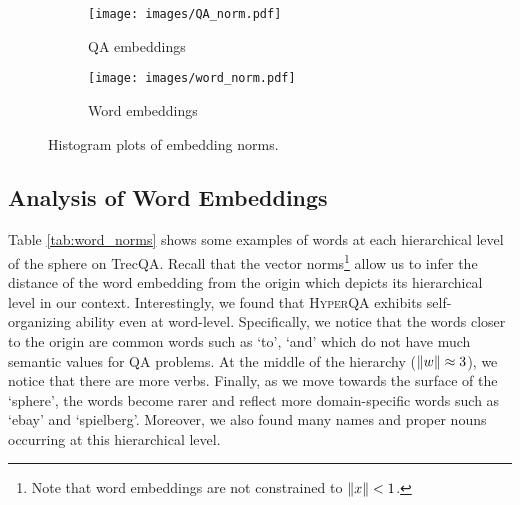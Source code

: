 \documentclass[sigconf]{acmart}
\DeclarePairedDelimiter\norm{\lVert}{\rVert}\fancyhead{}
\begin{document}
\begin{figure}[H]
\centering

\begin{subfigure}{0.21\textwidth}
  \centering
  \texttt{[image: images/QA\_norm.pdf]}
  \caption{QA embeddings}
  \label{fig:sub3}
\end{subfigure}\begin{subfigure}{0.21\textwidth}
  \centering
  \texttt{[image: images/word\_norm.pdf]}
  \caption{Word embeddings}
  \label{fig:sub4}
\end{subfigure}
\caption{Histogram plots of embedding norms.}
\label{fig:histograms}
\end{figure}


\subsection{Analysis of Word Embeddings}
Table \ref{tab:word_norms} shows some examples of words at each hierarchical level of the sphere on TrecQA. Recall that the vector norms\footnote{Note that word embeddings are not constrained to $\norm{x}<1$.} allow us to infer the distance of the word embedding from the origin which depicts its hierarchical level in our context. Interestingly, we found that \textsc{HyperQA} exhibits self-organizing ability even at word-level. Specifically, we notice that the words closer to the origin are common words such as `to', `and' which do not have much semantic values for QA problems. At the middle of the hierarchy ($\norm{w} \approx 3$), we notice that there are more verbs. Finally, as we move towards the surface of the `sphere', the words become rarer and reflect more domain-specific words such as `ebay' and `spielberg'. Moreover, we also found many names and proper nouns occurring at this hierarchical level. 
\end{document}

